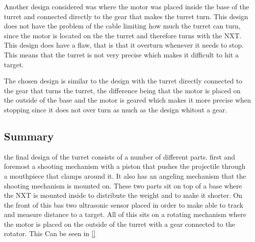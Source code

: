 Another design considered was where the motor was placed inside the base of the
turret and connected directly to the gear that makes the turret turn. This
design does not have the problem of the cable limiting how much the turret can
turn, since the motor is located on the the turret and therefore turns with the
NXT. This design does have a flaw, that is that it overturn whenever it needs to
stop. This means that the turret is not very precise which makes it difficult to
hit a target.\nl

The chosen design is similar to the design with the turret directly connected to
the gear that turns the turret, the difference being that the motor is placed on
the outside of the base and the motor is geared which makes it more precise when
stopping since it does not over turn as much as the design whitout a gear. 

\subsection{Summary}
the final design of the turret consists of a number of different parts. first
and foremost a shooting mechanism with a piston that pushes the projectile
through a mouthpiece that clamps around it. It also has an angeling mechanism
that the shooting mechanism is mounted on. These two parts sit on top of a
base where the NXT is mounted inside to distribute the weight and to make it
shorter. On the front of this bas two ultrasonic sensor placed in order to make
\name able to track and measure distance to a target. All of this sits on a
rotating mechanism where the motor is placed on the outside of the turret with
a gear connected to the rotator. This Can be seen in \autoref{}
